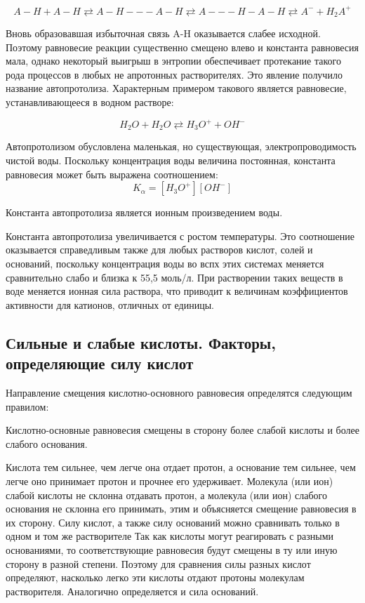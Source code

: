 \documentclass[14pt,a4paper]{scrartcl}
\begin{document}
$$A-H + A-H \rightleftarrows A-H---A-H \rightleftarrows A---H-A-H \rightleftarrows A^- + H_2A^+$$

Вновь образовавшая избыточная связь A-H оказывается слабее исходной. Поэтому  равновесие реакции существенно смещено влево и константа равновесия мала, однако некоторый выигрыш в энтропии обеспечивает протекание такого рода процессов в любых не апротонных растворителях. Это явление получило название автопротолиза. Характерным примером такового является равновесие, устанавливающееся в водном растворе:

$$H_2O + H_2O \rightleftarrows H_3O^+ + OH^-$$

Автопротолизом обусловлена маленькая, но существующая, электропроводимость чистой воды. Поскольку концентрация воды величина постоянная, константа равновесия может быть выражена соотношением: 
$$K_{\alpha} = \left[H_3O^+\right]\left[OH^-\right]$$

Константа автопротолиза является ионным произведением воды.

Константа автопротолиза увеличивается  с ростом температуры. Это соотношение оказывается справедливым также для любых растворов кислот, солей и оснований, поскольку концентрация воды во вспх этих системах меняется сравнительно слабо и близка к 55,5 моль/л. При растворении таких веществ в воде меняется ионная сила раствора, что приводит к величинам коэффициентов активности для катионов, отличных от единицы.

\subsection*{Сильные и слабые кислоты. Факторы, определяющие силу кислот}

Направление смещения кислотно-основного равновесия определятся следующим правилом:

Кислотно-основные равновесия смещены в сторону более слабой кислоты и более слабого основания.

Кислота тем сильнее, чем легче она отдает протон, а основание тем сильнее, чем легче оно принимает протон и прочнее его удерживает. Молекула (или ион) слабой кислоты не склонна отдавать протон, а молекула (или ион) слабого основания не склонна его принимать, этим и объясняется смещение равновесия в их сторону. Силу кислот, а также силу оснований можно сравнивать только в одном и том же растворителе
Так как кислоты могут реагировать с разными основаниями, то соответствующие равновесия будут смещены в ту или иную сторону в разной степени. Поэтому для сравнения силы разных кислот определяют, насколько легко эти кислоты отдают протоны молекулам растворителя. Аналогично определяется и сила оснований.
\end{document}
